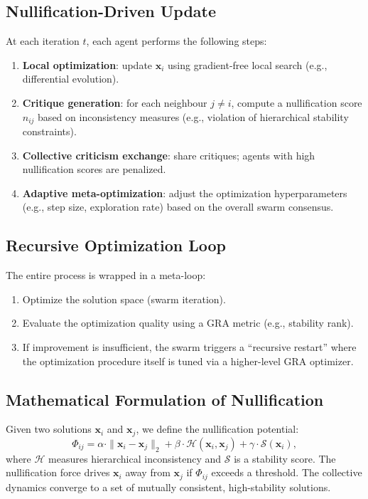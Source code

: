 \documentclass[12pt,a4paper]{article}
\begin{document}
\subsection{Nullification-Driven Update}
At each iteration $t$, each agent performs the following steps:
\begin{enumerate}
    \item \textbf{Local optimization}: update $\mathbf{x}_i$ using gradient-free local search (e.g., differential evolution).
    \item \textbf{Critique generation}: for each neighbour $j \neq i$, compute a nullification score $n_{ij}$ based on inconsistency measures (e.g., violation of hierarchical stability constraints).
    \item \textbf{Collective criticism exchange}: share critiques; agents with high nullification scores are penalized.
    \item \textbf{Adaptive meta-optimization}: adjust the optimization hyperparameters (e.g., step size, exploration rate) based on the overall swarm consensus.
\end{enumerate}

\subsection{Recursive Optimization Loop}
The entire process is wrapped in a meta-loop:
\begin{enumerate}
    \item Optimize the solution space (swarm iteration).
    \item Evaluate the optimization quality using a GRA metric (e.g., stability rank).
    \item If improvement is insufficient, the swarm triggers a ``recursive restart'' where the optimization procedure itself is tuned via a higher-level GRA optimizer.
\end{enumerate}

\subsection{Mathematical Formulation of Nullification}
Given two solutions $\mathbf{x}_i$ and $\mathbf{x}_j$, we define the nullification potential:
\[
\Phi_{ij} = \alpha \cdot \|\mathbf{x}_i - \mathbf{x}_j\|_2 + \beta \cdot \mathcal{H}(\mathbf{x}_i, \mathbf{x}_j) + \gamma \cdot \mathcal{S}(\mathbf{x}_i),
\]
where $\mathcal{H}$ measures hierarchical inconsistency and $\mathcal{S}$ is a stability score. The nullification force drives $\mathbf{x}_i$ away from $\mathbf{x}_j$ if $\Phi_{ij}$ exceeds a threshold. The collective dynamics converge to a set of mutually consistent, high-stability solutions.
\end{document}
